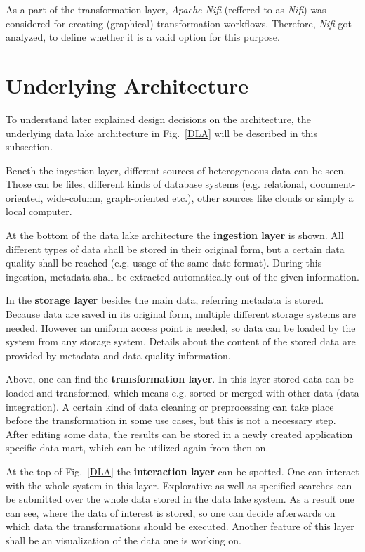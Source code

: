 \documentclass[conference]{IEEEtran}
\begin{document}
As a part of the transformation layer, \textit{Apache Nifi} (reffered to as \textit{Nifi}) was 
considered for creating (graphical) transformation workflows.
Therefore, \textit{Nifi} got analyzed, to define whether it is a valid option for this purpose.


\section{Underlying Architecture}\label{USA}
To understand later explained design decisions on the architecture, the underlying data lake 
architecture in Fig.~\ref{DLA} will be described in this subsection.

Beneth the ingestion layer, different sources of heterogeneous data can be seen.
Those can be files, different kinds of database systems (e.g. relational, document-oriented, 
wide-column, graph-oriented etc.), other sources like clouds or simply a local computer.

At the bottom of the data lake architecture the \textbf{ingestion layer} is shown.
All different types of data shall be stored in their original form, but a certain data quality shall
be reached (e.g. usage of the same date format). 
During this ingestion, metadata shall be extracted automatically out of the given information.

In the \textbf{storage layer} besides the main data, referring metadata is stored. 
Because data are saved in its original form, multiple different storage systems are needed. 
However an uniform access point is needed, so data can be loaded by the system from any 
storage system.
Details about the content of the stored data are provided by metadata and data quality information.

Above, one can find the \textbf{transformation layer}.
In this layer stored data can be loaded and transformed, which means e.g. sorted or merged with 
other data (data integration).
A certain kind of data cleaning or preprocessing can take place before the transformation in some 
use cases, but this is not a necessary step. 
After editing some data, the results can be stored in a newly created application specific data 
mart, which can be utilized again from then on.

At the top of Fig.~\ref{DLA} the \textbf{interaction layer} can be spotted.
One can interact with the whole system in this layer.
Explorative as well as specified searches can be submitted over the whole data stored in the data 
lake system. 
As a result one can see, where the data of interest is stored, so one can decide afterwards on which 
data the transformations should be executed.
Another feature of this layer shall be an visualization of the data one is working on.
\end{document}
